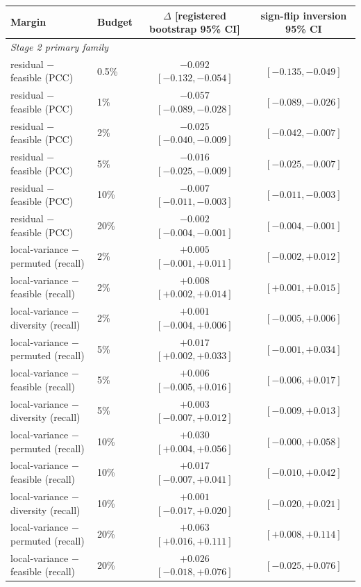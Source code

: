 \begin{tabular}{llcc}
\toprule
Margin & Budget & $\Delta$ [registered bootstrap 95\% CI] & sign-flip inversion 95\% CI \\
\midrule
\multicolumn{4}{l}{\emph{Stage 2 primary family}} \\
residual $-$ feasible (PCC) & 0.5\% & $-0.092$ $[-0.132, -0.054]$ & $[-0.135, -0.049]$ \\
residual $-$ feasible (PCC) & 1\% & $-0.057$ $[-0.089, -0.028]$ & $[-0.089, -0.026]$ \\
residual $-$ feasible (PCC) & 2\% & $-0.025$ $[-0.040, -0.009]$ & $[-0.042, -0.007]$ \\
residual $-$ feasible (PCC) & 5\% & $-0.016$ $[-0.025, -0.009]$ & $[-0.025, -0.007]$ \\
residual $-$ feasible (PCC) & 10\% & $-0.007$ $[-0.011, -0.003]$ & $[-0.011, -0.003]$ \\
residual $-$ feasible (PCC) & 20\% & $-0.002$ $[-0.004, -0.001]$ & $[-0.004, -0.001]$ \\
local-variance $-$ permuted (recall) & 2\% & ${+}0.005$ $[-0.001, {+}0.011]$ & $[-0.002, {+}0.012]$ \\
local-variance $-$ feasible (recall) & 2\% & ${+}0.008$ $[{+}0.002, {+}0.014]$ & $[{+}0.001, {+}0.015]$ \\
local-variance $-$ diversity (recall) & 2\% & ${+}0.001$ $[-0.004, {+}0.006]$ & $[-0.005, {+}0.006]$ \\
local-variance $-$ permuted (recall) & 5\% & ${+}0.017$ $[{+}0.002, {+}0.033]$ & $[-0.001, {+}0.034]$ \\
local-variance $-$ feasible (recall) & 5\% & ${+}0.006$ $[-0.005, {+}0.016]$ & $[-0.006, {+}0.017]$ \\
local-variance $-$ diversity (recall) & 5\% & ${+}0.003$ $[-0.007, {+}0.012]$ & $[-0.009, {+}0.013]$ \\
local-variance $-$ permuted (recall) & 10\% & ${+}0.030$ $[{+}0.004, {+}0.056]$ & $[-0.000, {+}0.058]$ \\
local-variance $-$ feasible (recall) & 10\% & ${+}0.017$ $[-0.007, {+}0.041]$ & $[-0.010, {+}0.042]$ \\
local-variance $-$ diversity (recall) & 10\% & ${+}0.001$ $[-0.017, {+}0.020]$ & $[-0.020, {+}0.021]$ \\
local-variance $-$ permuted (recall) & 20\% & ${+}0.063$ $[{+}0.016, {+}0.111]$ & $[{+}0.008, {+}0.114]$ \\
local-variance $-$ feasible (recall) & 20\% & ${+}0.026$ $[-0.018, {+}0.076]$ & $[-0.025, {+}0.076]$ \\

\end{tabular}
